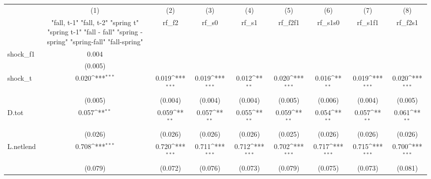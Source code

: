 {
\def\sym#1{\ifmmode^{#1}\else\(^{#1}\)\fi}
\begin{tabular}{l*{8}{c}}
\toprule
            &\multicolumn{1}{c}{(1)}&\multicolumn{1}{c}{(2)}&\multicolumn{1}{c}{(3)}&\multicolumn{1}{c}{(4)}&\multicolumn{1}{c}{(5)}&\multicolumn{1}{c}{(6)}&\multicolumn{1}{c}{(7)}&\multicolumn{1}{c}{(8)}\\
            &\multicolumn{1}{c}{  "fall, t-1" "fall, t-2" "spring t" "spring t-1"  "fall - fall" "spring - spring" "spring-fall" "fall-spring" }&\multicolumn{1}{c}{rf\_f2}&\multicolumn{1}{c}{rf\_s0}&\multicolumn{1}{c}{rf\_s1}&\multicolumn{1}{c}{rf\_f2f1}&\multicolumn{1}{c}{rf\_s1s0}&\multicolumn{1}{c}{rf\_s1f1}&\multicolumn{1}{c}{rf\_f2s1}\\
\midrule
shock\_f1    &       0.004         &                     &                     &                     &                     &                     &                     &                     \\
            &     (0.005)         &                     &                     &                     &                     &                     &                     &                     \\
\addlinespace
shock\_t     &       0.020\sym{***}&       0.019\sym{***}&       0.019\sym{***}&       0.012\sym{**} &       0.020\sym{***}&       0.016\sym{**} &       0.019\sym{***}&       0.020\sym{***}\\
            &     (0.005)         &     (0.004)         &     (0.004)         &     (0.004)         &     (0.005)         &     (0.006)         &     (0.004)         &     (0.005)         \\
\addlinespace
D.tot       &       0.057\sym{**} &       0.059\sym{**} &       0.057\sym{**} &       0.055\sym{**} &       0.059\sym{**} &       0.054\sym{**} &       0.057\sym{**} &       0.061\sym{**} \\
            &     (0.026)         &     (0.026)         &     (0.026)         &     (0.026)         &     (0.025)         &     (0.026)         &     (0.026)         &     (0.026)         \\
\addlinespace
L.netlend   &       0.708\sym{***}&       0.720\sym{***}&       0.711\sym{***}&       0.712\sym{***}&       0.702\sym{***}&       0.717\sym{***}&       0.715\sym{***}&       0.700\sym{***}\\
            &     (0.079)         &     (0.072)         &     (0.076)         &     (0.073)         &     (0.079)         &     (0.075)         &     (0.073)         &     (0.081)         \\

\end{tabular}}
